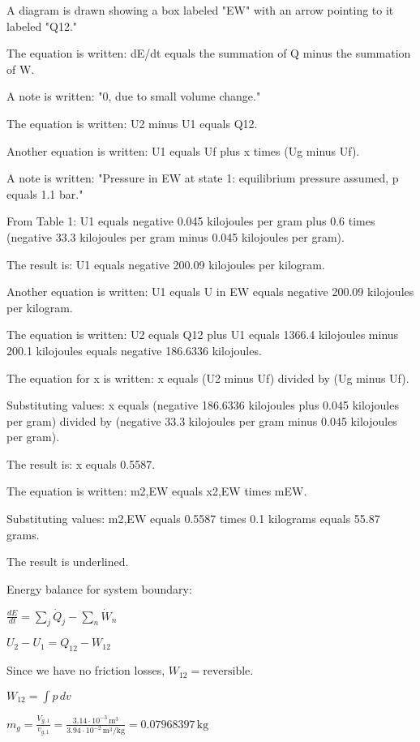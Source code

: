 A diagram is drawn showing a box labeled "EW" with an arrow pointing to it labeled "Q12."

The equation is written:
dE/dt equals the summation of Q minus the summation of W.

A note is written:
"0, due to small volume change."

The equation is written:
U2 minus U1 equals Q12.

Another equation is written:
U1 equals Uf plus x times (Ug minus Uf).

A note is written:
"Pressure in EW at state 1: equilibrium pressure assumed, p equals 1.1 bar."

From Table 1:
U1 equals negative 0.045 kilojoules per gram plus 0.6 times (negative 33.3 kilojoules per gram minus 0.045 kilojoules per gram).

The result is:
U1 equals negative 200.09 kilojoules per kilogram.

Another equation is written:
U1 equals U in EW equals negative 200.09 kilojoules per kilogram.

The equation is written:
U2 equals Q12 plus U1 equals 1366.4 kilojoules minus 200.1 kilojoules equals negative 186.6336 kilojoules.

The equation for x is written:
x equals (U2 minus Uf) divided by (Ug minus Uf).

Substituting values:
x equals (negative 186.6336 kilojoules plus 0.045 kilojoules per gram) divided by (negative 33.3 kilojoules per gram minus 0.045 kilojoules per gram).

The result is:
x equals 0.5587.

The equation is written:
m2,EW equals x2,EW times mEW.

Substituting values:
m2,EW equals 0.5587 times 0.1 kilograms equals 55.87 grams.

The result is underlined.

Energy balance for system boundary:  

\( \frac{dE}{dt} = \sum_j \dot{Q}_j - \sum_n \dot{W}_n \)  

\( U_2 - U_1 = Q_{12} - W_{12} \)  

Since we have no friction losses, \( W_{12} = \text{reversible} \).  

\( W_{12} = \int p \, dv \)  

\( m_g = \frac{V_{g,1}}{v_{g,1}} = \frac{3.14 \cdot 10^{-3} \, \text{m}^3}{3.94 \cdot 10^{-2} \, \text{m}^3/\text{kg}} = 0.07968397 \, \text{kg} \)